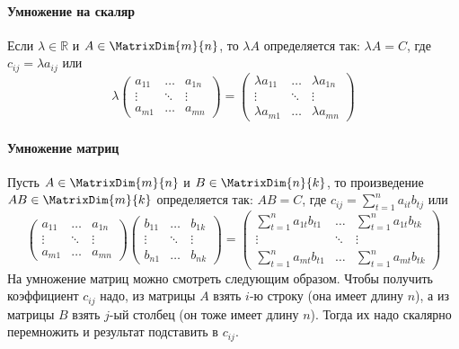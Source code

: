 \paragraph{Умножение на скаляр}
Если $\lambda\in \mathbb R$ и $A\in \MatrixDim{m}{n}$, то $\lambda A$ определяется так: $\lambda A = C$, где $c_{ij} = \lambda a_{ij}$ или
\[
\lambda
\begin{pmatrix}
a_{11}&\ldots& a_{1n}\\
\vdots&\ddots&\vdots\\
a_{m1}& \ldots &a_{mn}
\end{pmatrix}
=
\begin{pmatrix}
\lambda a_{11}&\ldots& \lambda a_{1n}\\
\vdots&\ddots&\vdots\\
\lambda a_{m1}& \ldots &\lambda a_{mn}
\end{pmatrix}
\]
\paragraph{Умножение матриц}
Пусть $A\in\MatrixDim{m}{n}$ и $B\in\MatrixDim{n}{k}$, то произведение $AB\in\MatrixDim{m}{k}$ определяется так: $AB = C$, где $c_{ij} = \sum_{t=1}^n a_{it}b_{tj}$ или
\[
\begin{pmatrix}
a_{11}&\ldots& a_{1n}\\
\vdots&\ddots&\vdots\\
a_{m1}& \ldots &a_{mn}
\end{pmatrix}
\begin{pmatrix}
b_{11}&\ldots& b_{1k}\\
\vdots&\ddots&\vdots\\
b_{n1}& \ldots &b_{nk}
\end{pmatrix}
=\begin{pmatrix}
\sum_{t=1}^n a_{1t}b_{t1}&\ldots& \sum_{t=1}^n a_{1t}b_{tk}\\
\vdots&\ddots&\vdots\\
\sum_{t=1}^n a_{mt}b_{t1}& \ldots &\sum_{t=1}^n a_{mt}b_{tk}
\end{pmatrix}
\]
На умножение матриц можно смотреть следующим образом.
Чтобы получить коэффициент $c_{ij}$ надо, из матрицы $A$ взять $i$-ю строку (она имеет длину $n$), а из матрицы $B$ взять $j$-ый столбец (он тоже имеет длину $n$).
Тогда их надо скалярно перемножить и результат подставить в $c_{ij}$.


